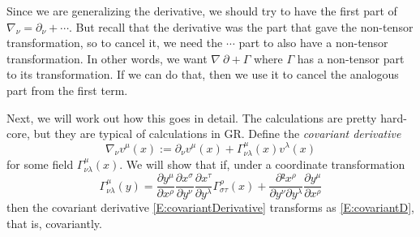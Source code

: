 Since we are generalizing the derivative, we should try to have the first part of $∇_ν = ∂_ν + \cdots $. But recall that the derivative was the part that gave the non-tensor transformation, so to cancel it, we need the $\cdots$ part to also have a non-tensor transformation. In other words, we want $∇ ~ ∂ + Γ$ where $Γ$ has a non-tensor part to its transformation. If we can do that, then we use it to cancel the analogous part from the first term. 

Next, we will work out how this goes in detail. The calculations are pretty hard-core, but they are typical of calculations in GR. 
Define the {\em covariant derivative}
\begin{equation} \label{E:covariantDerivative}
∇_ν v^μ(x) := ∂_ν v^μ(x) + Γ^μ _{νλ}(x) v^λ(x)
\end{equation}
for some field $Γ^μ _{νλ}(x)$. We will show that if, under a coordinate transformation
$$
Γ^μ _{νλ}(y) = \frac {∂y^μ}{∂x^ρ}\frac {∂x^σ}{∂y^ν}\frac {∂x^τ}{∂y^λ} Γ^ρ_{στ}(x) + \frac {∂²x^ρ}{∂y^ν∂y^λ} \frac {∂y^μ}{∂x^ρ} 
$$
then the covariant derivative \eqref{E:covariantDerivative} transforms as \eqref{E:covariantD}, that is, covariantly. 

